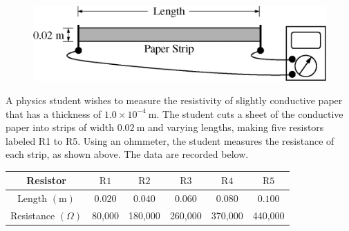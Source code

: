 %
\begin{figure}[h]
\centering
\includegraphics[scale=0.3]{images/img-016-029.png}
\end{figure}


\question
A physics student wishes to measure the resistivity of slightly conductive paper that has a thickness of $1.0 \times 10^{-4} \mathrm{~m}$. The student cuts a sheet of the conductive paper into strips of width $0.02 \mathrm{~m}$ and varying lengths, making five resistors labeled R1 to R5. Using an ohmmeter, the student measures the resistance of each strip, as shown above. The data are recorded below.


\begin{table}[h]
\centering
\begin{tabular}{|c|c|c|c|c|c|}
\hline Resistor & $\mathrm{R} 1$ & $\mathrm{R} 2$ & $\mathrm{R} 3$ & $\mathrm{R} 4$ & $\mathrm{R} 5$ \\
\hline Length $(\mathrm{m})$ & $0.020$ & $0.040$ & $0.060$ & $0.080$ & $0.100$ \\
\hline Resistance $(\Omega)$ & 80,000 & 180,000 & 260,000 & 370,000 & 440,000 \\
\hline
\end{tabular}
\end{table}




